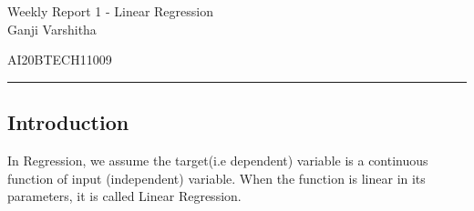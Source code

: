 \documentclass[12pt,letterpaper, onecolumn]{exam}
\begin{document}
\newtheorem{theorem}{Theorem}[section]
\newtheorem{problem}{Problem}
\newtheorem{proposition}{Proposition}[section]
\newtheorem{lemma}{Lemma}[section]
\newtheorem{corollary}[theorem]{Corollary}
\newtheorem{example}{Example}[section]
\newtheorem{definition}[problem]{Definition}

\newcommand{\BEQA}{\begin{eqnarray}}
\newcommand{\EEQA}{\end{eqnarray}}
\newcommand{\define}{\stackrel{\triangle}{=}}

\raggedbottom
\setlength{\parindent}{0pt}
\providecommand{\mbf}{\mathbf}
\providecommand{\norm}[1]{\lVert#1\rVert}
\providecommand{\pr}[1]{\ensuremath{\Pr\left(#1\right)}}
\providecommand{\qfunc}[1]{\ensuremath{Q\left(#1\right)}}
\providecommand{\sbrak}[1]{\ensuremath{{}\left[#1\right]}}
\providecommand{\lsbrak}[1]{\ensuremath{{}\left[#1\right.}}
\providecommand{\rsbrak}[1]{\ensuremath{{}\left.#1\right]}}
\providecommand{\brak}[1]{\ensuremath{\left(#1\right)}}
\providecommand{\lbrak}[1]{\ensuremath{\left(#1\right.}}
\providecommand{\rbrak}[1]{\ensuremath{\left.#1\right)}}
\providecommand{\cbrak}[1]{\ensuremath{\left\{#1\right\}}}
\providecommand{\lcbrak}[1]{\ensuremath{\left\{#1\right.}}
\providecommand{\rcbrak}[1]{\ensuremath{\left.#1\right\}}}
\let\vec\mathbf




\begingroup  
    \centering
    
    \LARGE Weekly Report 1 - Linear Regression\\[0.5em]
    
    \large Ganji Varshitha\par
    \large AI20BTECH11009\par
\endgroup
\rule{\textwidth}{0.4pt}
\pointsdroppedatright   %
\printanswers
\newcommand\Solution{
  \textbf{Solution:}\\}
\newcommand{\myvec}[1]{\ensuremath{\begin{bmatrix}#1\end{bmatrix}}}

 \subsection*{Introduction}
In Regression, we assume the target(i.e dependent) variable is a continuous function of input (independent) variable. When the function is linear in its parameters, it is called Linear Regression.
\end{document}
